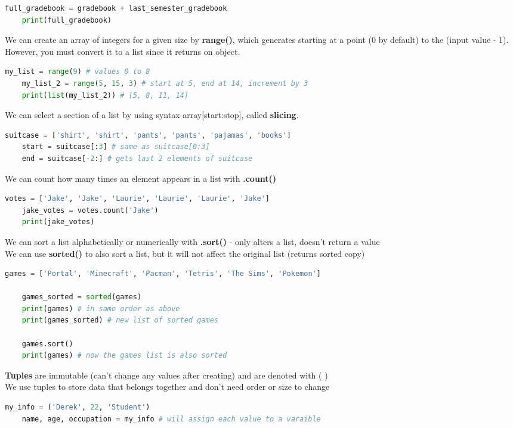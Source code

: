 \documentclass[11pt, a4paper]{article}
\begin{document}
\begin{spacing}{1.1}
\begin{lstlisting}[language=Python]
	full_gradebook = gradebook + last_semester_gradebook
	print(full_gradebook) \end{lstlisting}\vspace*{1mm}
	We can create an array of integers for a given size by \textbf{range()}, which generates starting at a point (0 by default) to the (input value - 1). However, you must convert it to a list since it returns on object.
	\begin{lstlisting}[language=Python]
	my_list = range(9) # values 0 to 8
	my_list_2 = range(5, 15, 3) # start at 5, end at 14, increment by 3
	print(list(my_list_2)) # [5, 8, 11, 14] \end{lstlisting}\vspace*{1mm}
	We can select a section of a list by using syntax array[start:stop], called \textbf{slicing}. 
	\begin{lstlisting}[language=Python]
	suitcase = ['shirt', 'shirt', 'pants', 'pants', 'pajamas', 'books']
	start = suitcase[:3] # same as suitcase[0:3]
	end = suitcase[-2:] # gets last 2 elements of suitcase \end{lstlisting}\vspace*{1mm}
	We can count how many times an element appears in a list with \textbf{.count()}
	\begin{lstlisting}[language=Python]
	votes = ['Jake', 'Jake', 'Laurie', 'Laurie', 'Laurie', 'Jake']
	jake_votes = votes.count('Jake')
	print(jake_votes) \end{lstlisting}\vspace*{1mm}
	We can sort a list alphabetically or numerically with \textbf{.sort()} - only alters a list, doesn't return a value \\
	We can use \textbf{sorted()} to also sort a list, but it will not affect the original list (returns sorted copy)
	\begin{lstlisting}[language=Python]
	games = ['Portal', 'Minecraft', 'Pacman', 'Tetris', 'The Sims', 'Pokemon']
	
	games_sorted = sorted(games)
	print(games) # in same order as above
	print(games_sorted) # new list of sorted games
	
	games.sort()
	print(games) # now the games list is also sorted \end{lstlisting}\vspace*{1mm}
	\textbf{Tuples} are immutable (can't change any values after creating) and are denoted with ( ) \\
	We use tuples to store data that belongs together and don't need order or size to change
	\begin{lstlisting}[language=Python]
	my_info = ('Derek', 22, 'Student')
	name, age, occupation = my_info # will assign each value to a varaible
	

\end{lstlisting}
\end{spacing}
\end{document}
